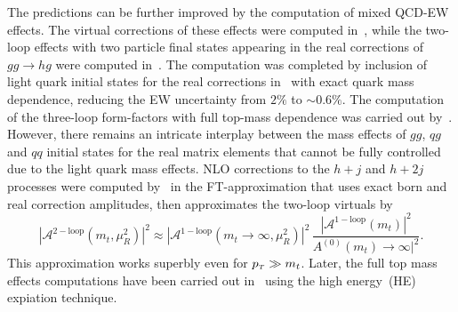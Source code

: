 \par The predictions can be further improved by the computation of mixed QCD-EW effects. The virtual corrections of these effects were computed in~\cite{Bonetti:2017ovy}, while the two-loop effects with two particle final states appearing in the real corrections of $ gg \to hg$  were computed in~\cite{Bonetti:2020hqh}. The computation was completed by inclusion of light quark initial states for the real corrections in~\cite{Becchetti:2020wof} with exact quark mass dependence, reducing the EW uncertainty from $2\%$ to $ \sim 0.6\%$.   The computation of the three-loop form-factors with full top-mass dependence was carried out by~\cite{Czakon:2020vql,Czakon:2021yub}. However, there remains an intricate interplay between the mass effects of $gg$, $qg$ and $qq$ initial states for the real matrix elements that cannot be fully controlled due to the light quark mass effects.  NLO corrections to the $h +j$ and $ h+2j$ processes were computed by~\cite{Maltoni:2014eza} in the FT-approximation that uses exact born and real correction amplitudes, then approximates the two-loop virtuals by
\begin{equation}
	|	\mathcal A^{\mathrm{2-loop}}(m_t,\mu_R^2) |^2 \approx  |	\mathcal A^{\mathrm{1-loop}}(m_t\to \infty,\mu_R^2) |^2\, \frac{|	\mathcal A^{\mathrm{1-loop}}(m_t) |^2}{A^{\mathrm{(0)}}(m_t)\to \infty |^2}. 
\end{equation}
This approximation works superbly even for $ p_{\scriptscriptstyle T} \gg m_t$. Later, the full top mass effects computations have been carried out in~\cite{Kudashkin:2017skd, Lindert:2018iug} using the high energy~(HE) expiation technique. 

